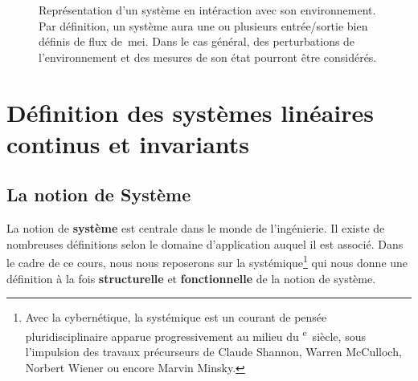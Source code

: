 \begin{figure}[!h]
    \centering
    
    \caption{Représentation d'un système en intéraction avec son environnement. 
             Par définition, un système aura une ou plusieurs entrée/sortie 
             bien définis de flux de~\gls{mei}. Dans le cas général, des 
             perturbations de l'environnement et des mesures de son état 
             pourront être considérés.\label{fig-systeme}}
\end{figure}
\newpage
\section[Définition SLCI]
        {Définition des systèmes linéaires continus et invariants}

\subsection{La notion de Système}
La notion de \textbf{système} est centrale dans le monde de l'ingénierie.
Il existe de nombreuses définitions selon le domaine 
d'application auquel il est associé. Dans le cadre de ce cours, nous nous 
reposerons sur la systémique\footnote{Avec la cybernétique, la systémique est 
un courant de pensée pluridisciplinaire apparue progressivement au milieu du 
\textsc{}\textsuperscript{e}~siècle, sous l'impulsion des 
travaux précurseurs de Claude Shannon, 
Warren McCulloch, 
Norbert Wiener 
ou encore Marvin Minsky.} 
qui nous donne une définition à la fois \textbf{structurelle} et 
\textbf{fonctionnelle} de la notion de système.

